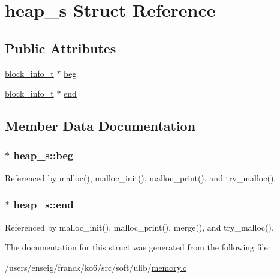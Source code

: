 \hypertarget{structheap__s}{\section{heap\-\_\-s Struct Reference}
\label{structheap__s}
}
\subsection*{Public Attributes}
\begin{DoxyCompactItemize}
\item 
\hyperlink{memory_8c_a08a87168dbf41c274c7f5f9918c8706b}{block\-\_\-info\-\_\-t} $\ast$ \hyperlink{structheap__s_a30840749cc5d580c1d1560051e4c8c2a}{beg}
\item 
\hyperlink{memory_8c_a08a87168dbf41c274c7f5f9918c8706b}{block\-\_\-info\-\_\-t} $\ast$ \hyperlink{structheap__s_a5cd7ea9b707bc85c4466b832aeb03919}{end}
\end{DoxyCompactItemize}


\subsection{Member Data Documentation}
\hypertarget{structheap__s_a30840749cc5d580c1d1560051e4c8c2a}{
\subsubsection[{beg}]{$\ast$ heap\-\_\-s\-::beg}}\label{structheap__s_a30840749cc5d580c1d1560051e4c8c2a}


Referenced by malloc(), malloc\-\_\-init(), malloc\-\_\-print(), and try\-\_\-malloc().

\hypertarget{structheap__s_a5cd7ea9b707bc85c4466b832aeb03919}{
\subsubsection[{end}]{$\ast$ heap\-\_\-s\-::end}}\label{structheap__s_a5cd7ea9b707bc85c4466b832aeb03919}


Referenced by malloc\-\_\-init(), malloc\-\_\-print(), merge(), and try\-\_\-malloc().



The documentation for this struct was generated from the following file\-:\begin{DoxyCompactItemize}
\item 
/users/enseig/franck/ko6/src/soft/ulib/\hyperlink{memory_8c}{memory.\-c}\end{DoxyCompactItemize}
